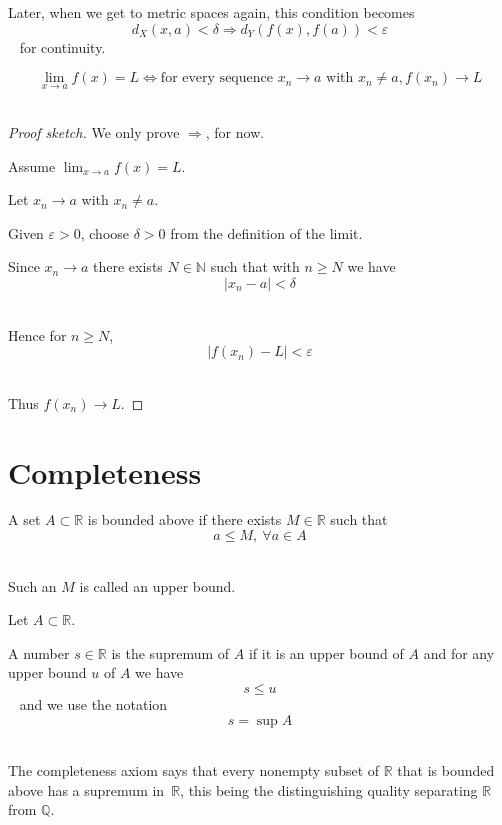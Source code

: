 Later, when we get to metric spaces again, this condition becomes 
$$ 
    d_X(x,a) < \delta \Rightarrow d_Y(f(x), f(a)) < \varepsilon
$$ 
for continuity. 

\begin{thm}
    $$ 
        \lim_{x\to a}f(x) = L \Leftrightarrow 
        \text{for every sequence } x_n \to a \text{ with }
        x_n \neq a, f(x_n) \to L
    $$ 
\end{thm}
\begin{proof}[Proof sketch]
    We only prove $\Rightarrow$, for now. 

    Assume $\lim_{x\to a}f(x) = L$. 

    Let $x_n \to a$ with $x_n \neq a$. 

    Given $\varepsilon > 0$, choose $\delta > 0$ from the 
    definition of the limit. 

    Since $x_n \to a$ there exists $N \in \mathbb N$ such that 
    with $n \geq N$ we have 
    $$ 
        |x_n - a| < \delta 
    $$ 

    Hence for $n \geq N$, 
    $$ 
        |f(x_n) - L| < \varepsilon
    $$ 

    Thus $f(x_n) \to L$.
\end{proof}

\newpage 
\section{Completeness}
\begin{defn}
    \label{defn:upper_bound}
    A set $A \subset \mathbb R$ is bounded above if 
    there exists $M \in \mathbb R$ such that 
    $$ 
        a \leq M, \: \forall a \in A
    $$ 

    Such an $M$ is called an upper bound. 
\end{defn}

\begin{defn}[Supremum]
    \label{defn:sup}
    Let $A \subset \mathbb R$. 

    A number $s \in \mathbb R$ is the supremum of $A$ if it 
    is an upper bound of $A$ and for any 
    upper bound $u$ of $A$ we have 
    $$ 
        s \leq u
    $$  
    and we use the notation 
    $$ 
        s = \sup A
    $$ 
\end{defn}

The completeness axiom says that every nonempty subset of 
$\mathbb R$ that is bounded above has a supremum in $\mathbb R$, 
this being the distinguishing quality separating 
$\mathbb R$ from $\mathbb Q$. 

